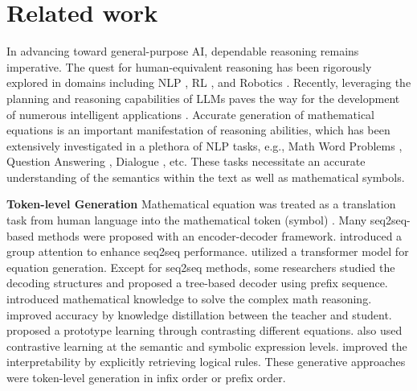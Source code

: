 \documentclass[11pt]{article}
\begin{document}
\section{Related work}
In advancing toward general-purpose AI, dependable reasoning remains imperative. The quest for human-equivalent reasoning has been rigorously explored in domains including NLP \citep{kojima2022large}, RL \citep{ijcai2022p654}, and Robotics \citep{Zhang2021LearningTN}. Recently, leveraging the planning and reasoning capabilities of LLMs paves the way for the development of numerous intelligent applications \citep{wei2022chain, shen2023hugginggpt, zhang2023data}. Accurate generation of mathematical equations is an important manifestation of reasoning abilities, which has been extensively investigated in a plethora of NLP tasks, e.g., Math Word Problems \citep{wang2017deep, ling-etal-2017-program, xie2019goal, wang2022structure}, Question Answering \citep{yu2018qanet, wu2020biased}, Dialogue \citep{bocklisch2017rasa, wu2022towards, wu2023focus}, etc. These tasks necessitate an accurate understanding of the semantics within the text as well as mathematical symbols. 











\indent \textbf{Token-level Generation} Mathematical equation was treated as a translation task from human language into the mathematical token (symbol) \citep{wang2017deep,chiang-chen-2019-semantically}. Many seq2seq-based methods were proposed with an encoder-decoder framework. \citet{li-etal-2019-modeling} introduced a group attention to enhance seq2seq performance. \citet{lan2021mwptoolkit} utilized a transformer model for equation generation. Except for seq2seq methods, some researchers \citep{liu-etal-2019-tree,xie2019goal,zhang2020graph,HGEN} studied the decoding structures and proposed a tree-based decoder using prefix sequence. \citet{wu2020knowledge,wu-etal-2021-math,qin-etal-2021-neural,yu-etal-2021-improving} introduced mathematical knowledge to solve the complex math reasoning. \citet{ijcai2021-485} improved accuracy by knowledge distillation between the teacher and student. \citet{li2021seeking} proposed a prototype learning through contrasting different equations. \citet{shen2022textual,liang-etal-2022-analogical} also used contrastive learning at the semantic and symbolic expression levels. \citet{yang2022logicsolver} improved the interpretability by explicitly retrieving logical rules. These generative approaches were token-level generation in infix order or prefix order.
\end{document}
